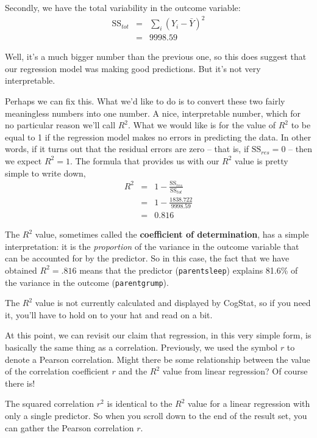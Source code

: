\documentclass[
]{book}
\theoremstyle{definition}
\theoremstyle{definition}
\theoremstyle{definition}
\theoremstyle{definition}
\theoremstyle{remark}
\begin{document}
Secondly, we have the total variability in the outcome variable:
\[
\begin{array}{rcl}
\mbox{SS}_{tot} &=& \sum_i (Y_i - \bar{Y})^2
    \\
    &=&  9998.59
\end{array}
\]

Well, it's a much bigger number than the previous one, so this does suggest that our regression model was making good predictions. But it's not very interpretable.

Perhaps we can fix this. What we'd like to do is to convert these two fairly meaningless numbers into one number. A nice, interpretable number, which for no particular reason we'll call \(R^2\). What we would like is for the value of \(R^2\) to be equal to 1 if the regression model makes no errors in predicting the data. In other words, if it turns out that the residual errors are zero -- that is, if \(\mbox{SS}_{res} = 0\) -- then we expect \(R^2 = 1\). The formula that provides us with our \(R^2\) value is pretty simple to write down,
\[
\begin{array}{rcl}
R^2 &=& 1 - \frac{\mbox{SS}_{res}}{\mbox{SS}_{tot}}
    \\
    &=& 1 - \frac{1838.722}{9998.59}
    \\
    &=& 0.816
\end{array}
\]

The \(R^2\) value, sometimes called the \textbf{coefficient of determination}, has a simple interpretation: it is the \emph{proportion} of the variance in the outcome variable that can be accounted for by the predictor. So in this case, the fact that we have obtained \(R^2 = .816\) means that the predictor (\texttt{parentsleep}) explains 81.6\% of the variance in the outcome (\texttt{parentgrump}).

The \(R^2\) value is not currently calculated and displayed by CogStat, so if you need it, you'll have to hold on to your hat and read on a bit.

At this point, we can revisit our claim that regression, in this very simple form, is basically the same thing as a correlation. Previously, we used the symbol \(r\) to denote a Pearson correlation. Might there be some relationship between the value of the correlation coefficient \(r\) and the \(R^2\) value from linear regression? Of course there is!

The squared correlation \(r^2\) is identical to the \(R^2\) value for a linear regression with only a single predictor. So when you scroll down to the end of the result set, you can gather the Pearson correlation \(r\).
\end{document}
